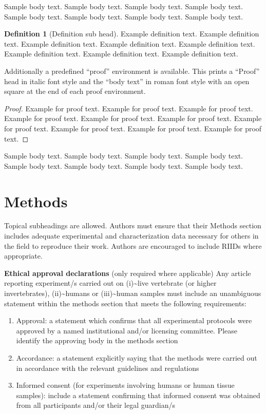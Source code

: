 \documentclass[sn-basic,pdflatex]{sn-jnl}
\theoremstyle{remark}
\theoremstyle{definition}
\newtheorem{definition}{Definition}%
\begin{document}
Sample body text. Sample body text. Sample body text. Sample body text.
Sample body text. Sample body text. Sample body text. Sample body text.

\begin{definition}[Definition sub head]
Example definition text. Example definition text. Example definition
text. Example definition text. Example definition text. Example
definition text. Example definition text. Example definition text.

\end{definition}

Additionally a predefined ``proof'' environment is available. This
prints a ``Proof'' head in italic font style and the ``body text'' in
roman font style with an open square at the end of each proof
environment.

\begin{proof}
Example for proof text. Example for proof text. Example for proof text.
Example for proof text. Example for proof text. Example for proof text.
Example for proof text. Example for proof text. Example for proof text.
Example for proof text.

\end{proof}

Sample body text. Sample body text. Sample body text. Sample body text.
Sample body text. Sample body text. Sample body text. Sample body text.

\section{Methods}\label{sec11}

Topical subheadings are allowed. Authors must ensure that their Methods
section includes adequate experimental and characterization data
necessary for others in the field to reproduce their work. Authors are
encouraged to include RIIDs where appropriate.

\textbf{Ethical approval declarations} (only required where applicable)
Any article reporting experiment/s carried out on
(i)\textasciitilde live vertebrate (or higher invertebrates),
(ii)\textasciitilde humans or (iii)\textasciitilde human samples must
include an unambiguous statement within the methods section that meets
the following requirements:

\begin{enumerate}
\def\labelenumi{\arabic{enumi}.}
\item
  Approval: a statement which confirms that all experimental protocols
  were approved by a named institutional and/or licensing committee.
  Please identify the approving body in the methods section
\item
  Accordance: a statement explicitly saying that the methods were
  carried out in accordance with the relevant guidelines and regulations
\item
  Informed consent (for experiments involving humans or human tissue
  samples): include a statement confirming that informed consent was
  obtained from all participants and/or their legal guardian/s
\end{enumerate}
\end{document}
